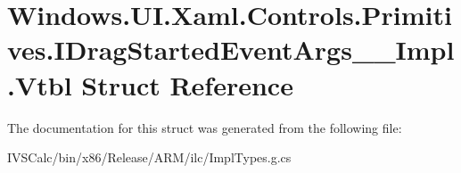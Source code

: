 \hypertarget{struct_windows_1_1_u_i_1_1_xaml_1_1_controls_1_1_primitives_1_1_i_drag_started_event_args_____impl_1_1_vtbl}{}\section{Windows.\+U\+I.\+Xaml.\+Controls.\+Primitives.\+I\+Drag\+Started\+Event\+Args\+\_\+\+\_\+\+Impl.\+Vtbl Struct Reference}
\label{struct_windows_1_1_u_i_1_1_xaml_1_1_controls_1_1_primitives_1_1_i_drag_started_event_args_____impl_1_1_vtbl}


The documentation for this struct was generated from the following file\+:\begin{DoxyCompactItemize}
\item 
I\+V\+S\+Calc/bin/x86/\+Release/\+A\+R\+M/ilc/Impl\+Types.\+g.\+cs\end{DoxyCompactItemize}
